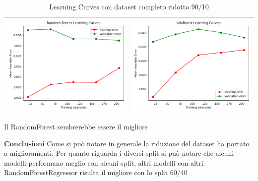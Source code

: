 \begin{table}[H]
\begin{tabularx}{\textwidth}{|X|X|}
        \includegraphics[width=\linewidth, trim=0 0 0 0]{images/RandomForest_lc90_ridotto.png} &
        \includegraphics[width=\linewidth, trim=0 0 0 0]{images/AdaBoost_lc90_ridotto.png} \\
        \hline
    \end{tabularx}
    \caption{Learning Curves con dataset completo ridotto 90/10}
    \label{tab:emissions_info}
\end{table}

\noindent Il RandomForest sembrerebbe essere il migliore


\noindent
\textbf{Conclusioni}
Come si può notare in generale la riduzione del dataset ha portato a miglioramenti. Per quanto riguarda i diversi split si può notare che alcuni modelli performano meglio con alcuni split, altri modelli con altri. RandomForestRegressor risulta il migliore con lo split 60/40

